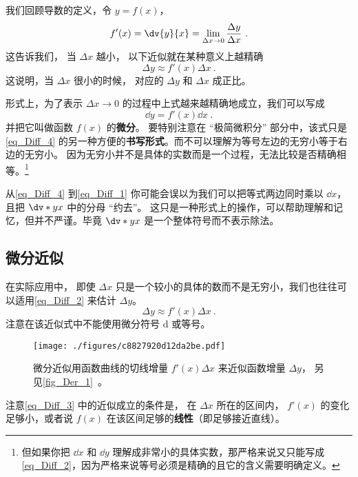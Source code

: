 
我们回顾导数的定义，令 $y = f(x)$，
\begin{equation}\label{eq_Diff_4}
f'(x) = \dv{y}{x} = \lim_{\Delta x\to 0} \frac{\Delta y}{\Delta x}~.
\end{equation}
这告诉我们， 当 $\Delta x$ 越小， 以下近似就在某种意义上越精确
\begin{equation}\label{eq_Diff_2}
\Delta y \approx f'(x) \Delta x~.
\end{equation}
这说明，当 $\Delta x$ 很小的时候， 对应的 $\Delta y$ 和 $\Delta x$ 成正比。

形式上，为了表示 $\Delta x\to 0$ 的过程中上式越来越精确地成立，我们可以写成
\begin{equation}\label{eq_Diff_1}
\dd{y} = f'(x)\dd{x}~.
\end{equation}
并把它叫做函数 $f(x)$ 的\textbf{微分}。 要特别注意在 “极简微积分” 部分中，该式只是\autoref{eq_Diff_4} 的另一种方便的\textbf{书写形式}。而不可以理解为等号左边的无穷小等于右边的无穷小。 因为无穷小并不是具体的实数而是一个过程，无法比较是否精确相等。\footnote{但如果你把 $\dd{x}$ 和 $\dd{y}$ 理解成非常小的具体实数，那严格来说又只能写成\autoref{eq_Diff_2}，因为严格来说等号必须是精确的且它的含义需要明确定义。}

从\autoref{eq_Diff_4} 到\autoref{eq_Diff_1} 你可能会误以为我们可以把等式两边同时乘以 $\dd{x}$，且把 $\dv*{y}{x}$ 中的分母 “约去”。 这只是一种形式上的操作，可以帮助理解和记忆，但并不严谨。毕竟 $\dv*{y}{x}$ 是一个整体符号而不表示除法。

\subsection{微分近似}\label{sub_Diff_1}

在实际应用中， 即使 $\Delta x$ 只是一个较小的具体的数而不是无穷小，我们也往往可以适用\autoref{eq_Diff_2} 来估计 $\Delta y$。
\begin{equation}\label{eq_Diff_3}
\Delta y \approx f'(x) \Delta x~.
\end{equation}
注意在该近似式中不能使用微分符号 $\mathrm{d}$ 或等号。

\begin{figure}[ht]
\centering
\texttt{[image: ./figures/c8827920d12da2be.pdf]}
\caption{微分近似用函数曲线的切线增量 $f'(x)\Delta x$ 来近似函数增量 $\Delta y$， 另见\autoref{fig_Der_1}~。} \label{fig_Diff_1}
\end{figure}
注意\autoref{eq_Diff_3} 中的近似成立的条件是， 在 $\Delta x$ 所在的区间内， $f'(x)$ 的变化足够小，或者说 $f(x)$ 在该区间足够的\textbf{线性}（即足够接近直线）。

